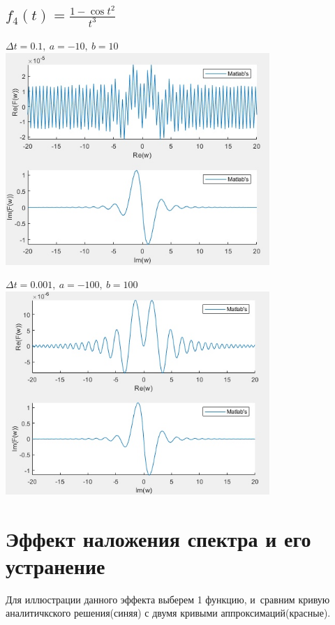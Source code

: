 \documentclass{article}
\begin{document}
{\large\subsection{$f_4(t) = \frac{1-\cos t^2}{t^3}$}}
\begin{center}
  $\Delta t = 0.1,\ a = -10,\ b = 10$
  \includegraphics[width = 10cm, height 10cm]{f4_1.jpg}
  \vspace{1cm}
  
  $\Delta t = 0.001,\ a = -100,\ b = 100$
  \includegraphics[width = 10cm, height 10cm]{f4_2.jpg}
\end{center}

\newpage

  
{\Large\bfseries\section{Эффект наложения спектра и его \\ устранение}}
\noindent Для иллюстрации данного эффекта выберем 1 функцию, и~сравним кривую аналитичкского решения(синяя) с двумя кривыми аппроксимаций(красные).
\end{document}
